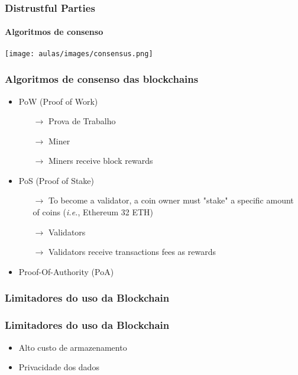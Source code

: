 \documentclass{beamer}
\begin{document}
\begin{frame}
    \frametitle{Distrustful Parties}
    \framesubtitle{Algoritmos de consenso}
\end{frame}

\begin{frame}
\begin{center}
\texttt{[image: aulas/images/consensus.png]}
\end{center}
\end{frame}

\begin{frame}
\frametitle{Algoritmos de consenso das blockchains}
\begin{itemize}
    \item PoW (Proof of Work)
    \begin{itemize}
        \item [$\rightarrow$] Prova de Trabalho
        \item [$\rightarrow$] Miner
        \item [$\rightarrow$] Miners receive block rewards
    \end{itemize}

    \item PoS (Proof of Stake)
        \begin{itemize}
        \item [$\rightarrow$] To become a validator, a coin owner must "stake" a specific amount of coins (\textit{i.e.}, Ethereum 32 ETH)
        \item [$\rightarrow$] Validators
        \item [$\rightarrow$] Validators receive transactions fees as rewards
    \end{itemize}
\item Proof-Of-Authority (PoA)
\end{itemize}
\end{frame}



\begin{frame}
    \frametitle{Limitadores do uso da Blockchain}
\end{frame}

\begin{frame}
    \frametitle{Limitadores do uso da Blockchain}
    \begin{itemize}
        \item Alto custo de armazenamento
        \item Privacidade dos dados
    \end{itemize}
\end{frame}
\end{document}
